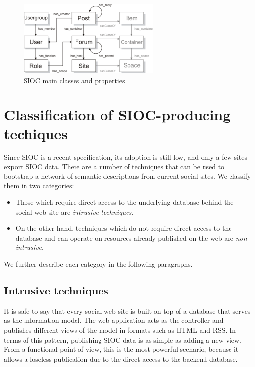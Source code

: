 \documentclass{../templates/www2008-submission}
\begin{document}
\begin{figure}[ht]
 \centering
 \includegraphics[width=7cm]{images/sioc.png}
 \caption{SIOC main classes and properties}
\end{figure}

\section{Classification of SIOC-producing techiques}

Since SIOC is a recent specification, its adoption is still low, and
only a few sites export SIOC data. There are a number of techniques
that can be used to bootstrap a network of semantic descriptions from
current social sites. We classify them in two categories:

\begin{itemize}
\item Those which require direct access to the underlying database behind
the social web site are \emph{intrusive techniques}.
\item On the other hand, techniques which do not require direct access to
the database and can operate on resources already published on the web
are \emph{non-intrusive}.
\end{itemize}

We further describe each category in the following paragraphs.

\subsection{Intrusive techniques}

It is safe to say that every social web site is built on top of a
database that serves as the information model. The web application
acts as the controller and publishes different views of the model in
formats such as HTML and RSS. In terms of this pattern, publishing
SIOC data is as simple as adding a new view.
From a functional point of view, this is the most powerful scenario, because
it allows a loseless publication due to the direct access
to the backend database.
\end{document}
